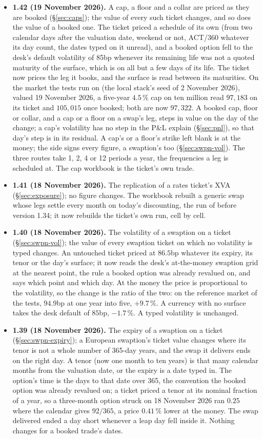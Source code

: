\documentclass[11pt,a4paper]{article}
\begin{document}
{\begin{itemize}[leftmargin=1.4em, itemsep=4pt]
\item \textbf{1.42 (19 November 2026).} A cap, a floor and a collar are priced as they are booked (\S\ref{sec:caps}); the value of every such ticket changes, and so does the value of a booked one. The ticket priced a schedule of its own (from two calendar days after the valuation date, weekend or not, ACT/360 whatever its day count, the dates typed on it unread), and a booked option fell to the desk's default volatility of 85bp whenever its remaining life was not a quoted maturity of the surface, which is on all but a few days of its life. The ticket now prices the leg it books, and the surface is read between its maturities. On the market the tests run on (the local stack's seed of 2 November 2026), valued 19 November 2026, a five-year $4.5\,\%$ cap on ten million read $97{,}183$ on its ticket and $105{,}015$ once booked; both are now $97{,}322$. A booked cap, floor or collar, and a cap or a floor on a swap's leg, steps in value on the day of the change; a cap's volatility has no step in the P\&L explain (\S\ref{sec:pnl}), so that day's step is in its residual. A cap's or a floor's strike left blank is at the money; the side signs every figure, a swaption's too (\S\ref{sec:swpn-vol}). The three routes take 1, 2, 4 or 12 periods a year, the frequencies a leg is scheduled at. The cap workbook is the ticket's own trade.
\item \textbf{1.41 (18 November 2026).} The replication of a rates ticket's XVA (\S\ref{sec:exposure}); no figure changes. The workbook rebuilt a generic swap whose legs settle every month on today's discounting, the run of before version 1.34; it now rebuilds the ticket's own run, cell by cell.
\item \textbf{1.40 (18 November 2026).} The volatility of a swaption on a ticket (\S\ref{sec:swpn-vol}); the value of every swaption ticket on which no volatility is typed changes. An untouched ticket priced at $86.5$bp whatever its expiry, its tenor or the day's surface; it now reads the desk's at-the-money swaption grid at the nearest point, the rule a booked option was already revalued on, and says which point and which day. At the money the price is proportional to the volatility, so the change is the ratio of the two: on the reference market of the tests, $94.9$bp at one year into five, $+9.7\,\%$. A currency with no surface takes the desk default of $85$bp, $-1.7\,\%$. A typed volatility is unchanged.
\item \textbf{1.39 (18 November 2026).} The expiry of a swaption on a ticket (\S\ref{sec:swpn-expiry}); a European swaption's ticket value changes where its tenor is not a whole number of 365-day years, and the swap it delivers ends on the right day. A tenor (now one month to ten years) is that many calendar months from the valuation date, or the expiry is a date typed in. The option's time is the days to that date over 365, the convention the booked option was already revalued on; a ticket priced a tenor at its nominal fraction of a year, so a three-month option struck on 18 November 2026 ran $0.25$ where the calendar gives $92/365$, a price $0.41\,\%$ lower at the money. The swap delivered ended a day short whenever a leap day fell inside it. Nothing changes for a booked trade's dates.

\end{itemize}}
\end{document}

